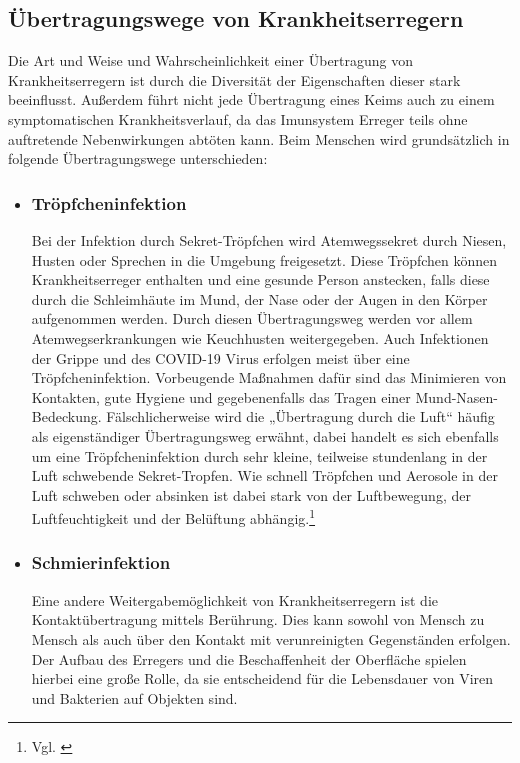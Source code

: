 \documentclass[12pt]{article}
\begin{document}
\subsection{Übertragungswege von Krankheitserregern}
Die Art und Weise und Wahrscheinlichkeit einer Übertragung von Krankheitserregern ist durch die Diversität der Eigenschaften dieser stark beeinflusst. Außerdem führt nicht jede Übertragung eines Keims auch zu einem symptomatischen Krankheitsverlauf, da das Imunsystem Erreger teils ohne auftretende Nebenwirkungen abtöten kann. Beim Menschen wird grundsätzlich in folgende Übertragungswege unterschieden:
\begin{itemize}
    \item \subsubsection{Tröpfcheninfektion}\label{sec:Troepfchen}
    Bei der Infektion durch Sekret-Tröpfchen wird Atemwegssekret durch Niesen, Husten oder Sprechen in die Umgebung freigesetzt. Diese Tröpfchen können Krankheitserreger enthalten und eine gesunde Person anstecken, falls diese durch die Schleimhäute im  Mund, der Nase oder der Augen in den Körper aufgenommen werden. Durch diesen Übertragungsweg werden vor allem Atemwegserkrankungen wie Keuchhusten weitergegeben. Auch Infektionen der Grippe und des COVID-19 Virus erfolgen meist über eine Tröpfcheninfektion. Vorbeugende Maßnahmen dafür sind das Minimieren von Kontakten, gute Hygiene und gegebenenfalls das Tragen einer Mund-Nasen-Bedeckung.
    Fälschlicherweise wird die „Übertragung durch die Luft“ häufig als eigenständiger Übertragungsweg erwähnt, dabei handelt es sich ebenfalls um eine Tröpfcheninfektion durch sehr kleine, teilweise stundenlang in der Luft schwebende Sekret-Tropfen. Wie schnell Tröpfchen und Aerosole in der Luft schweben oder absinken ist dabei stark von der Luftbewegung, der Luftfeuchtigkeit und der Belüftung abhängig.\footnote{Vgl. \cite{Rki21}}
    \item \subsubsection{Schmierinfektion}
    Eine andere Weitergabemöglichkeit von Krankheitserregern ist die Kontaktübertragung mittels Berührung. Dies kann sowohl von Mensch zu Mensch als auch über den Kontakt mit verunreinigten Gegenständen erfolgen. Der Aufbau des Erregers und die Beschaffenheit der Oberfläche spielen hierbei eine große Rolle, da sie entscheidend für die Lebensdauer von Viren und Bakterien auf Objekten sind.

\end{itemize}
\end{document}
